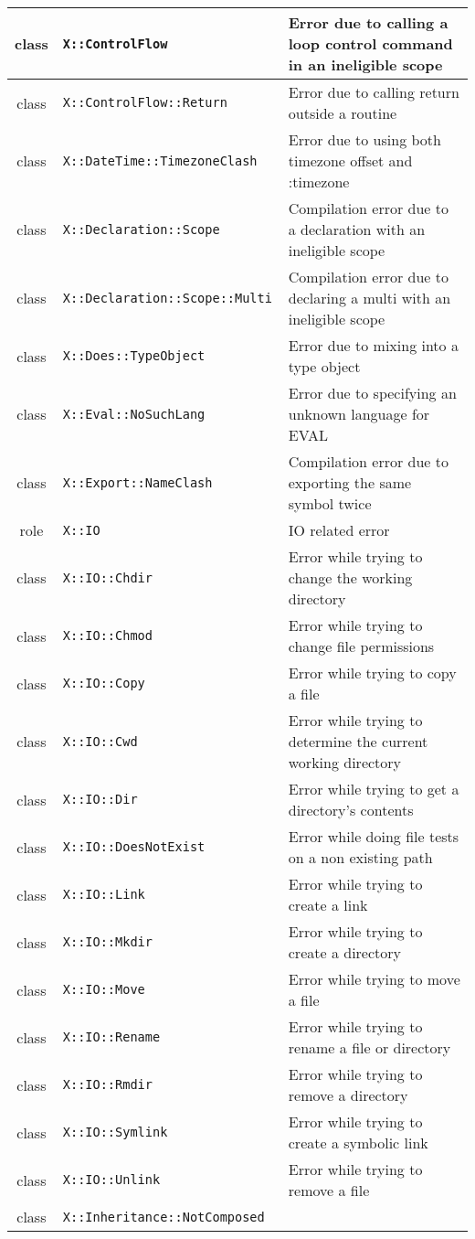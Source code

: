 \documentclass[17pt,english]{extarticle}
\providecommand{\tabularnewline}{\\}
\begin{document}
\begin{longtable}{|c||>{\centering}p{}||>{\centering}p{}|}
\hline 
\hline 
class  &
\texttt{X::ControlFlow } &
Error due to calling a loop control command in an ineligible scope\tabularnewline
\hline 
\hline 
class  &
\texttt{X::ControlFlow::Return } &
Error due to calling return outside a routine\tabularnewline
\hline 
\hline 
class  &
\texttt{X::DateTime::TimezoneClash } &
Error due to using both timezone offset and :timezone\tabularnewline
\hline 
\hline 
class  &
\texttt{X::Declaration::Scope } &
Compilation error due to a declaration with an ineligible scope\tabularnewline
\hline 
\hline 
class  &
\texttt{X::Declaration::Scope::Multi } &
Compilation error due to declaring a multi with an ineligible scope\tabularnewline
\hline 
\hline 
class  &
\texttt{X::Does::TypeObject } &
Error due to mixing into a type object\tabularnewline
\hline 
\hline 
class  &
\texttt{X::Eval::NoSuchLang } &
Error due to specifying an unknown language for EVAL\tabularnewline
\hline 
\hline 
class  &
\texttt{X::Export::NameClash } &
Compilation error due to exporting the same symbol twice\tabularnewline
\hline 
\hline 
role  &
\texttt{X::IO } &
IO related error\tabularnewline
\hline 
\hline 
class  &
\texttt{X::IO::Chdir } &
Error while trying to change the working directory\tabularnewline
\hline 
\hline 
class  &
\texttt{X::IO::Chmod } &
Error while trying to change file permissions\tabularnewline
\hline 
\hline 
class  &
\texttt{X::IO::Copy } &
Error while trying to copy a file\tabularnewline
\hline 
\hline 
class  &
\texttt{X::IO::Cwd } &
Error while trying to determine the current working directory\tabularnewline
\hline 
\hline 
class  &
\texttt{X::IO::Dir } &
Error while trying to get a directory's contents\tabularnewline
\hline 
\hline 
class  &
\texttt{X::IO::DoesNotExist } &
Error while doing file tests on a non existing path\tabularnewline
\hline 
\hline 
class  &
\texttt{X::IO::Link } &
Error while trying to create a link\tabularnewline
\hline 
\hline 
class  &
\texttt{X::IO::Mkdir } &
Error while trying to create a directory\tabularnewline
\hline 
\hline 
class  &
\texttt{X::IO::Move } &
Error while trying to move a file\tabularnewline
\hline 
\hline 
class  &
\texttt{X::IO::Rename } &
Error while trying to rename a file or directory\tabularnewline
\hline 
\hline 
class  &
\texttt{X::IO::Rmdir } &
Error while trying to remove a directory\tabularnewline
\hline 
\hline 
class  &
\texttt{X::IO::Symlink } &
Error while trying to create a symbolic link\tabularnewline
\hline 
\hline 
class  &
\texttt{X::IO::Unlink } &
Error while trying to remove a file\tabularnewline
\hline 
\hline 
class  &
\texttt{X::Inheritance::NotComposed } &

\end{longtable}
\end{document}
